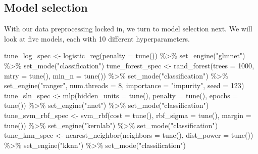 \documentclass[
]{article}
\newenvironment{Shaded}{\begin{snugshade}}{\end{snugshade}}
\newcommand{\AttributeTok}[1]{\textcolor[rgb]{0.77,0.63,0.00}{#1}}
\newcommand{\DecValTok}[1]{\textcolor[rgb]{0.00,0.00,0.81}{#1}}
\newcommand{\FunctionTok}[1]{\textcolor[rgb]{0.00,0.00,0.00}{#1}}
\newcommand{\NormalTok}[1]{#1}
\newcommand{\OtherTok}[1]{\textcolor[rgb]{0.56,0.35,0.01}{#1}}
\newcommand{\SpecialCharTok}[1]{\textcolor[rgb]{0.00,0.00,0.00}{#1}}
\newcommand{\StringTok}[1]{\textcolor[rgb]{0.31,0.60,0.02}{#1}}
\begin{document}
\hypertarget{model-selection}{%
\subsection{Model selection}\label{model-selection}}

With our data preprocessing locked in, we turn to model selection next.
We will look at five models, each with 10 different hyperparameters.

\begin{Shaded}
\begin{Highlighting}[]
\NormalTok{tune\_log\_spec }\OtherTok{\textless{}{-}}
  \FunctionTok{logistic\_reg}\NormalTok{(}\AttributeTok{penalty =} \FunctionTok{tune}\NormalTok{()) }\SpecialCharTok{\%\textgreater{}\%}
  \FunctionTok{set\_engine}\NormalTok{(}\StringTok{"glmnet"}\NormalTok{) }\SpecialCharTok{\%\textgreater{}\%}
  \FunctionTok{set\_mode}\NormalTok{(}\StringTok{"classification"}\NormalTok{)}
\NormalTok{tune\_forest\_spec }\OtherTok{\textless{}{-}}
  \FunctionTok{rand\_forest}\NormalTok{(}\AttributeTok{trees =} \DecValTok{1000}\NormalTok{, }\AttributeTok{mtry =} \FunctionTok{tune}\NormalTok{(), }\AttributeTok{min\_n =} \FunctionTok{tune}\NormalTok{()) }\SpecialCharTok{\%\textgreater{}\%}
  \FunctionTok{set\_mode}\NormalTok{(}\StringTok{"classification"}\NormalTok{) }\SpecialCharTok{\%\textgreater{}\%}
  \FunctionTok{set\_engine}\NormalTok{(}\StringTok{"ranger"}\NormalTok{, }\AttributeTok{num.threads =} \DecValTok{8}\NormalTok{, }\AttributeTok{importance =} \StringTok{"impurity"}\NormalTok{, }\AttributeTok{seed =} \DecValTok{123}\NormalTok{)}
\NormalTok{tune\_sln\_spec }\OtherTok{\textless{}{-}}
  \FunctionTok{mlp}\NormalTok{(}\AttributeTok{hidden\_units =} \FunctionTok{tune}\NormalTok{(), }\AttributeTok{penalty =} \FunctionTok{tune}\NormalTok{(), }\AttributeTok{epochs =} \FunctionTok{tune}\NormalTok{()) }\SpecialCharTok{\%\textgreater{}\%}
  \FunctionTok{set\_engine}\NormalTok{(}\StringTok{"nnet"}\NormalTok{) }\SpecialCharTok{\%\textgreater{}\%}
  \FunctionTok{set\_mode}\NormalTok{(}\StringTok{"classification"}\NormalTok{)}
\NormalTok{tune\_svm\_rbf\_spec }\OtherTok{\textless{}{-}}
  \FunctionTok{svm\_rbf}\NormalTok{(}\AttributeTok{cost =} \FunctionTok{tune}\NormalTok{(), }\AttributeTok{rbf\_sigma =} \FunctionTok{tune}\NormalTok{(), }\AttributeTok{margin =} \FunctionTok{tune}\NormalTok{()) }\SpecialCharTok{\%\textgreater{}\%}
  \FunctionTok{set\_engine}\NormalTok{(}\StringTok{"kernlab"}\NormalTok{) }\SpecialCharTok{\%\textgreater{}\%}
  \FunctionTok{set\_mode}\NormalTok{(}\StringTok{"classification"}\NormalTok{)}
\NormalTok{tune\_knn\_spec }\OtherTok{\textless{}{-}}
  \FunctionTok{nearest\_neighbor}\NormalTok{(}\AttributeTok{neighbors =} \FunctionTok{tune}\NormalTok{(), }\AttributeTok{dist\_power =} \FunctionTok{tune}\NormalTok{()) }\SpecialCharTok{\%\textgreater{}\%}
  \FunctionTok{set\_engine}\NormalTok{(}\StringTok{"kknn"}\NormalTok{) }\SpecialCharTok{\%\textgreater{}\%}
  \FunctionTok{set\_mode}\NormalTok{(}\StringTok{"classification"}\NormalTok{)}


\end{Highlighting}
\end{Shaded}
\end{document}
